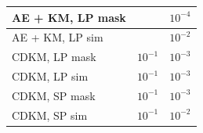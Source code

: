 \documentclass{beamer}
\begin{document}
\begin{frame}
\begin{table}
{\begin{tabular}{|l|l|l|}
    AE + KM, LP mask  &\cellcolor{gray}  &$10^{-4}$         \\ \hline
    AE + KM, LP sim   &\cellcolor{gray} &$10^{-2}$         \\ \hline
       CDKM, LP mask  &$10^{-1}$  &$10^{-3}$         \\ \hline
       CDKM, LP sim   &$10^{-1}$  &$10^{-3}$         \\ \hline
       CDKM, SP mask  &$10^{-1}$  &$10^{-3}$         \\ \hline
       CDKM, SP sim   &$10^{-1}$  &$10^{-2}$         \\ \hline
\end{tabular}
}
\end{table}
\end{frame}
\end{document}
